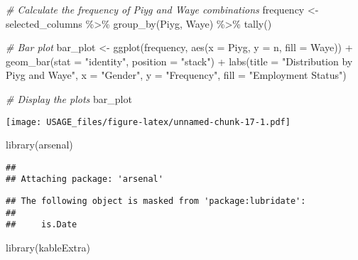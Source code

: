 \documentclass[
]{article}
\newenvironment{Shaded}{\begin{snugshade}}{\end{snugshade}}
\newcommand{\AttributeTok}[1]{\textcolor[rgb]{0.77,0.63,0.00}{#1}}
\newcommand{\CommentTok}[1]{\textcolor[rgb]{0.56,0.35,0.01}{\textit{#1}}}
\newcommand{\FunctionTok}[1]{\textcolor[rgb]{0.00,0.00,0.00}{#1}}
\newcommand{\NormalTok}[1]{#1}
\newcommand{\OtherTok}[1]{\textcolor[rgb]{0.56,0.35,0.01}{#1}}
\newcommand{\SpecialCharTok}[1]{\textcolor[rgb]{0.00,0.00,0.00}{#1}}
\newcommand{\StringTok}[1]{\textcolor[rgb]{0.31,0.60,0.02}{#1}}
\begin{document}
\begin{Shaded}
\begin{Highlighting}[]
\CommentTok{\# Calculate the frequency of Piyg and Waye combinations}
\NormalTok{frequency }\OtherTok{\textless{}{-}}\NormalTok{ selected\_columns }\SpecialCharTok{\%\textgreater{}\%}
  \FunctionTok{group\_by}\NormalTok{(Piyg, Waye) }\SpecialCharTok{\%\textgreater{}\%}
  \FunctionTok{tally}\NormalTok{()}

\CommentTok{\# Bar plot}
\NormalTok{bar\_plot }\OtherTok{\textless{}{-}} \FunctionTok{ggplot}\NormalTok{(frequency, }\FunctionTok{aes}\NormalTok{(}\AttributeTok{x =}\NormalTok{ Piyg, }\AttributeTok{y =}\NormalTok{ n, }\AttributeTok{fill =}\NormalTok{ Waye)) }\SpecialCharTok{+}
  \FunctionTok{geom\_bar}\NormalTok{(}\AttributeTok{stat =} \StringTok{"identity"}\NormalTok{, }\AttributeTok{position =} \StringTok{"stack"}\NormalTok{) }\SpecialCharTok{+}
  \FunctionTok{labs}\NormalTok{(}\AttributeTok{title =} \StringTok{"Distribution by Piyg and Waye"}\NormalTok{,}
       \AttributeTok{x =} \StringTok{"Gender"}\NormalTok{,}
       \AttributeTok{y =} \StringTok{"Frequency"}\NormalTok{,}
       \AttributeTok{fill =} \StringTok{"Employment Status"}\NormalTok{)}



\CommentTok{\# Display the plots}
\NormalTok{bar\_plot}
\end{Highlighting}
\end{Shaded}

\texttt{[image: USAGE\_files/figure-latex/unnamed-chunk-17-1.pdf]}

\begin{Shaded}
\begin{Highlighting}[]
\FunctionTok{library}\NormalTok{(arsenal)}
\end{Highlighting}
\end{Shaded}

\begin{verbatim}
## 
## Attaching package: 'arsenal'
\end{verbatim}

\begin{verbatim}
## The following object is masked from 'package:lubridate':
## 
##     is.Date
\end{verbatim}

\begin{Shaded}
\begin{Highlighting}[]
\FunctionTok{library}\NormalTok{(kableExtra)}
\end{Highlighting}
\end{Shaded}
\end{document}
